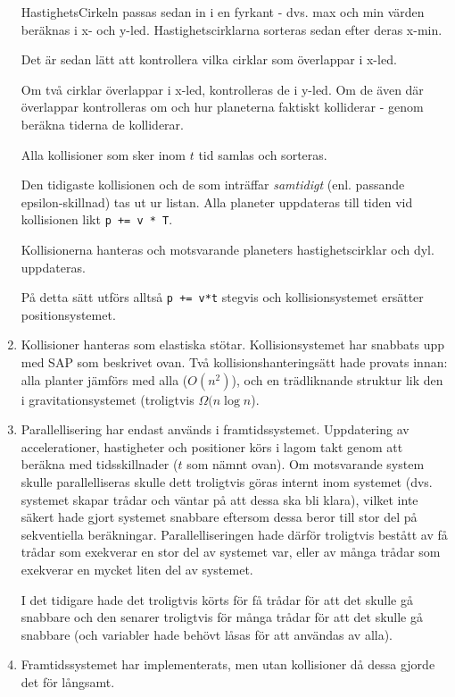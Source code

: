 \begin{enumerate}
        HastighetsCirkeln passas sedan in i en fyrkant - dvs.
        max och min värden beräknas i x- och y-led.
        Hastighetscirklarna sorteras sedan efter deras x-min.

        Det är sedan lätt att kontrollera vilka cirklar som överlappar
        i x-led.

        Om två cirklar överlappar i x-led, kontrolleras de i y-led.
        Om de även där överlappar kontrolleras om och hur
        planeterna faktiskt kolliderar - genom beräkna tiderna de kolliderar.

        Alla kollisioner som sker inom $t$ tid samlas och sorteras.

        Den tidigaste kollisionen och de som inträffar \textit{samtidigt}
        (enl. passande epsilon-skillnad) tas ut ur listan.
        Alla planeter uppdateras till tiden vid kollisionen likt
        \verb#p += v * T#.

        Kollisionerna hanteras och motsvarande planeters hastighetscirklar
        och dyl. uppdateras. 

        På detta sätt utförs alltså \verb#p += v*t# stegvis och
        kollisionsystemet ersätter positionsystemet.

    \item Kollisioner hanteras som elastiska stötar.
        Kollisionsystemet har snabbats upp med SAP som beskrivet ovan.
        Två kollisionshanteringsätt hade provats innan:
        alla planter jämförs med alla ($O(n^2)$),
        och en trädliknande struktur lik den i gravitationsystemet
        (troligtvis $\Omega(n\log n$).
    \item Parallellisering har endast används i framtidssystemet.
        Uppdatering av accelerationer, hastigheter och positioner
        körs i lagom takt genom att beräkna med tidsskillnader
        ($t$ som nämnt ovan).
        Om  motsvarande system skulle parallelliseras skulle dett troligtvis
        göras internt inom systemet (dvs. systemet skapar trådar
        och väntar på att dessa ska bli klara), vilket inte säkert
        hade gjort systemet snabbare eftersom dessa beror till stor del
        på sekventiella beräkningar.
        Parallelliseringen hade därför troligtvis bestått av få
        trådar som exekverar en stor del av systemet var, eller
        av många trådar som exekverar en mycket liten del av systemet.

        I det tidigare hade det troligtvis körts för få trådar för
        att det skulle gå snabbare och den senarer troligtvis för
        många trådar för att det skulle gå snabbare (och variabler
        hade behövt låsas för att användas av alla).

    \item Framtidssystemet har implementerats, men utan kollisioner
        då dessa gjorde det för långsamt.
\end{enumerate}

